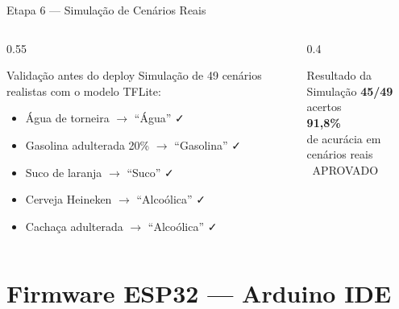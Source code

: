 \documentclass[aspectratio=169, 11pt]{beamer}
\begin{document}
\begin{frame}{Etapa 6 — Simulação de Cenários Reais}
  \begin{columns}[T]
    \begin{column}{0.55\textwidth}
      \begin{block}{Validação antes do deploy}
        Simulação de 49 cenários realistas com o modelo TFLite:
        \begin{itemize}
          \item Água de torneira $\rightarrow$ ``Água'' \textcolor{green!60!black}{\faCheck}
          \item Gasolina adulterada 20\% $\rightarrow$ ``Gasolina'' \textcolor{green!60!black}{\faCheck}
          \item Suco de laranja $\rightarrow$ ``Suco'' \textcolor{green!60!black}{\faCheck}
          \item Cerveja Heineken $\rightarrow$ ``Alcoólica'' \textcolor{green!60!black}{\faCheck}
          \item Cachaça adulterada $\rightarrow$ ``Alcoólica'' \textcolor{green!60!black}{\faCheck}
        \end{itemize}
      \end{block}
    \end{column}
    \begin{column}{0.4\textwidth}
      \begin{exampleblock}{Resultado da Simulação}
        \centering
        \Huge\textbf{45/49}\\
        \normalsize acertos\\
        \vspace{0.3cm}
        \Large\textbf{91,8\%}\\
        \normalsize de acurácia em cenários reais\\
        \vspace{0.3cm}
        \textcolor{green!60!black}{\Large\faCheckCircle\ APROVADO}
      \end{exampleblock}
    \end{column}
  \end{columns}
\end{frame}

\section{Firmware ESP32 — Arduino IDE}
\end{document}
